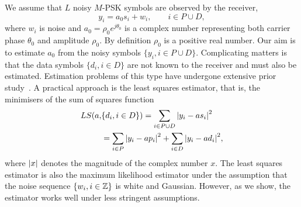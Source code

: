 \documentclass[journal]{IEEEtran}
\begin{document}
We assume that %
$L$ noisy $M$-PSK symbols are observed by the receiver,  %
\begin{equation}\label{eq:sigmod}
y_i = a_0 s_i + w_i, \qquad i \in P \cup D,
\end{equation}
where $w_i$ is noise and $a_0 = \rho_0 e^{j\theta_0}$ is a complex number representing both carrier phase $\theta_0$ and amplitude $\rho_0$.  By definition $\rho_0$ is a positive real number.  Our aim is to estimate $a_0$ from the noisy symbols $\{ y_i, i \in P \cup D \}$.  Complicating matters is that the data symbols $\{d_i, i \in D\}$ are not known to the receiver and must also be estimated.  Estimation problems of this type have undergone extensive prior study~\cite{ViterbiViterbi_phase_est_1983,Cowley_ref_sym_carr_1998,Wilson1989,Makrakis1990,Liu1991,Mackenthun1994,Sweldens2001,McKilliamLinearTimeBlockPSK2009,Divsalar1990,580211,974597,Mengali_andre_synchro_book}.  A practical approach is the least squares estimator, that is, the minimisers of the sum of squares function
\begin{equation}\label{eq:LSdefn}
\begin{split}
LS(a, &\{d_i, i \in D\}) = \sum_{i \in P \cup D} {\left\vert  y_i - a s_i  \right\vert}^2  \\
&= \sum_{i \in P} {\left\vert  y_i - a p_i  \right\vert}^2 + \sum_{i \in D} {\left\vert  y_i - a d_i  \right\vert}^2,
\end{split}
\end{equation}
where ${\left\vert x \right\vert}$ denotes the magnitude of the complex number $x$.  The least squares estimator is also the maximum likelihood estimator under the assumption that the noise sequence $\{w_i, i \in {\mathbb Z}\}$ is white and Gaussian.  However, as we show, the estimator works well under less stringent assumptions.  %
\end{document}

